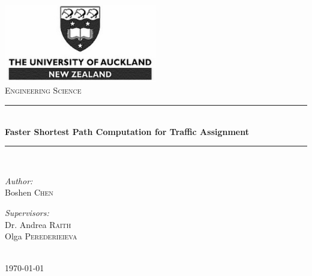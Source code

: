 \begin{titlepage}
    \newcommand{\HRule}{\rule{\linewidth}{0.5mm}}
    \centering
    \includegraphics[width=0.5\textwidth]{img/logo.pdf}\\[2cm]    
    \textsc{\Large Engineering Science}\\[2cm]
    \HRule \\[0.4cm]
    { \huge \bfseries Faster Shortest Path Computation for Traffic Assignment
    }\\[0.4cm]
    \HRule \\[2cm]

    \begin{minipage}{0.4\textwidth}
        \begin{flushleft} \large
            \emph{Author:}\\
            Boshen \textsc{Chen}
        \end{flushleft}
    \end{minipage}
    \begin{minipage}{0.4\textwidth}
        \begin{flushright} \large
            \emph{Supervisors:} \\
            Dr. Andrea \textsc{Raith} \\
            Olga \textsc{Perederieieva}
        \end{flushright}
    \end{minipage}\\[4cm]

    \vfill
    {\large \today}
    \thispagestyle{empty}
\end{titlepage} 
